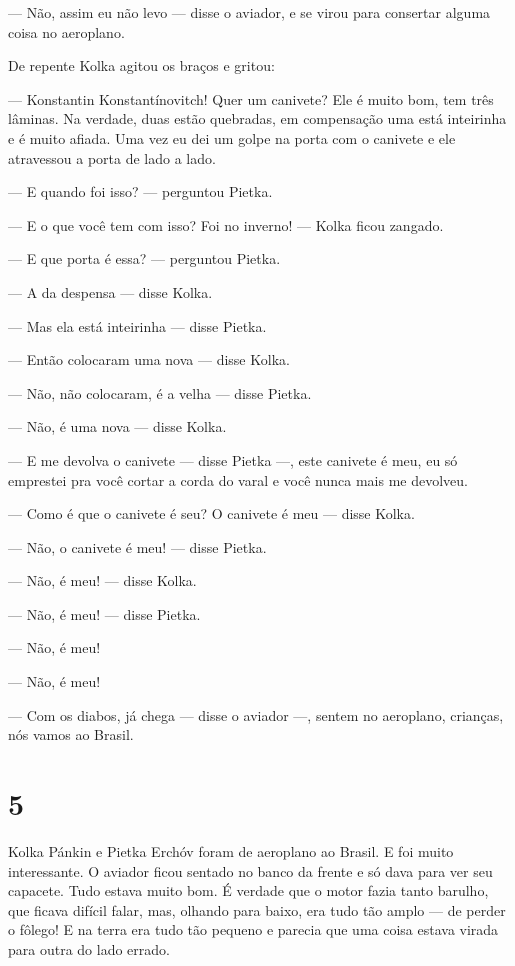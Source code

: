 --- Não, assim eu não levo --- disse o aviador, e se virou para
consertar alguma coisa no aeroplano.

De repente Kolka agitou os braços e gritou:

--- Konstantin Konstantínovitch! Quer um canivete? Ele é muito bom, tem
três lâminas. Na verdade, duas estão quebra­das, em compensação uma está
inteirinha e é muito afiada. Uma vez eu dei um golpe na porta com o
canivete e ele atravessou a porta de lado a lado.

--- E quando foi isso? --- perguntou Pietka.

--- E o que você tem com isso? Foi no inverno! --- Kolka ficou zangado.

--- E que porta é essa? --- perguntou Pietka.

--- A da despensa --- disse Kolka.

--- Mas ela está inteirinha --- disse Pietka.

--- Então colocaram uma nova --- disse Kolka.

--- Não, não colocaram, é a velha --- disse Pietka.

--- Não, é uma nova --- disse Kolka.

--- E me devolva o canivete --- disse Pietka ---, este canivete é meu,
eu só emprestei pra você cortar a corda do varal e você nunca mais me
devolveu.

--- Como é que o canivete é seu? O canivete é meu --- disse Kolka.

--- Não, o canivete é meu! --- disse Pietka.

--- Não, é meu! --- disse Kolka.

--- Não, é meu! --- disse Pietka.

--- Não, é meu!

--- Não, é meu!

--- Com os diabos, já chega --- disse o aviador ---, sentem no
aeroplano, crianças, nós vamos ao Brasil.

\section{5}

Kolka Pánkin e Pietka Erchóv foram de aeroplano ao Brasil. E foi muito
interessante. O aviador ficou sentado no banco da frente e só dava para
ver seu capacete. Tudo estava muito bom. É verdade que o motor fazia
tanto barulho, que ficava difícil falar, mas, olhando para baixo, era
tudo tão amplo --- de perder o fôlego! E na terra era tudo tão pequeno e
parecia que uma coisa estava virada para outra do lado errado.

